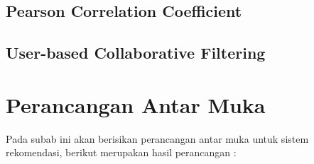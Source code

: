 \subsection{Pearson Correlation Coefficient}

\subsection{User-based Collaborative Filtering}

\section{Perancangan Antar Muka}
\label{sec:perancangan antar muka}

Pada subab ini akan berisikan perancangan antar muka untuk sistem rekomendasi, berikut merupakan hasil perancangan :

